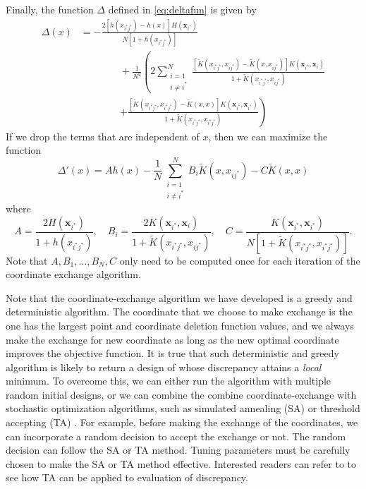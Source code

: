 \documentclass[graybox]{svmult}
\newcommand{\vx}{\boldsymbol{x}}
\newcommand{\tK}{\widetilde{K}}
\begin{document}
Finally, the  function $\Delta$ defined in \eqref{eq:deltafun} is given by
\begin{align}\label{eq:deltafunction}
\nonumber
\Delta(x)
&= -\frac{2\left[  h(x_{i^*j^*})-h(x)    \right]H(\vx_{i^*})}{N[1 + h(x_{i^*j^*})]}   \\
\nonumber
& \qquad \qquad +\frac{1}{N^2}\left(2\sum_{\substack{i=1 \\ i \ne i^*}}^N  \frac{[\tK(x_{i^*j^*},x_{ij^*})-\tK(x,x_{ij^*})] K(\vx_{i^*},\vx_i)} {1 + \tK(x_{i^*j^*},x_{ij^*})} \right . \\
\nonumber
& \qquad \qquad \left . + \frac{[\tK(x_{i^*j^*},x_{i^*j^*})-\tK(x,x)] K(\vx_{i^*},\vx_{i^*})} {1 + \tK(x_{i^*j^*},x_{i^*j^*})} \right )
\end{align} 
If we drop the terms that are independent of $x$, then we can maximize the function
\begin{equation*} %
\Delta'(x) = Ah(x)  - \frac{1}{N}\sum_{\substack{i=1 \\ i \ne i^*}}^N B_i \tK(x,x_{ij^*}) - C \tK(x,x)
\end{equation*}
where
\begin{equation*}
A = \frac{2H(\vx_{i^*})}{1 + h(x_{i^*j^*})}, \quad
B_i  = \frac{2K(\vx_{i^*},\vx_i)} {1 + \tK(x_{i^*j^*},x_{ij^*})}, \quad
C  = \frac{K(\vx_{i^*},\vx_{i^*})} {N[1 + \tK(x_{i^*j^*},x_{i^*j^*})]}.
\end{equation*}
Note that $A, B_1, \ldots, B_N, C$ only need to be computed once for each iteration of the coordinate exchange algorithm.

Note that the coordinate-exchange algorithm we have developed is a greedy and deterministic algorithm. 
The coordinate that we choose to make exchange is the one has the largest point and coordinate deletion function values, and we always make the exchange for new coordinate as long as the new optimal coordinate improves the objective function. 
It is true that such deterministic and greedy algorithm is likely to return a design of whose discrepancy attains a \emph{local} minimum. 
To overcome this, we can either run the algorithm with multiple random initial designs, or we can combine the combine coordinate-exchange with stochastic optimization algorithms, such as simulated annealing (SA) \cite{kirkpatrick1983optimization} or threshold accepting (TA) \cite{fang2003lower}. 
For example, before making the exchange of the coordinates, we can incorporate a random decision to accept the exchange or not. 
The random decision can follow the SA or TA method. 
Tuning parameters must be carefully chosen to make the SA or TA method effective. 
Interested readers can refer to \cite{winker1997application} to see how TA can be applied to evaluation of discrepancy. 
\end{document}
